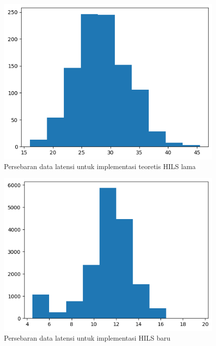 \begin{figure}[!htbp]
	\centering
	\includegraphics[width=1.0\textwidth]{resources/chapter-4/old-hils-data.png}
	\caption{Persebaran data latensi untuk implementasi teoretis HILS lama}
	\label{chapter-4-fig-perf-result-old-hils}
\end{figure}
\begin{figure}[!htbp]
	\centering
	\includegraphics[width=1.0\textwidth]{resources/chapter-4/new-hils-data.png}
	\caption{Persebaran data latensi untuk implementasi HILS baru}
	\label{chapter-4-fig-perf-result-new-hils}
\end{figure}

